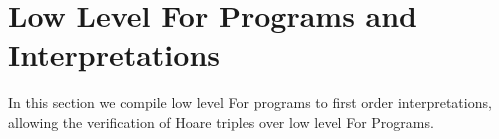 \section{Low Level For Programs and Interpretations}
\label{sec:low_level}

In this section we compile low level For programs to first order interpretations,
allowing the verification of Hoare triples over low level For Programs.
